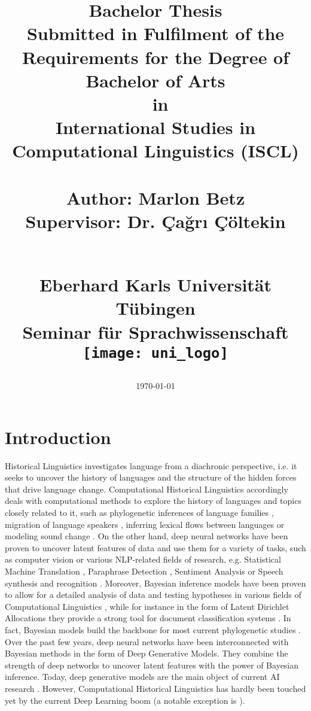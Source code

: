 \documentclass[6pt]{article}
\title{
	{Bachelor Thesis}\\
	{\normalsize Submitted in Fulfilment of the Requirements for the Degree of} \\ %
{\large Bachelor of Arts} \\ %
	 {\small in} \\  %
	 {\large  International Studies in Computational Linguistics (ISCL) } \\ \vspace*{1cm} \hline \vspace*{1cm} 
	{\Huge \mathrm{Unsupervised Cognate Identification with Variational Autoencoders}}\\ \vspace*{1cm} \hline \vspace*{1cm}
	{\LARGE  Author: Marlon Betz }  \\
	{\LARGE  Supervisor: Dr. Çağrı Çöltekin }  \\
\date{\today} \\
\vspace*{2cm}
	{\Large Eberhard Karls Universität Tübingen}\\
	{\large Seminar für Sprachwissenschaft} \\
	\vspace*{1cm}
	{\texttt{[image: uni\_logo]}}
}
\begin{document}
\thispagestyle{empty}
\maketitle
\thispagestyle{empty}
\newpage

 

\newpage
\newpage

\tableofcontents
\thispagestyle{empty}
\newpage
{}
\setcounter{page}{1}

\section{Introduction}

Historical Linguistics investigates language from a diachronic perspective, i.e. it seeks to uncover the history of languages and the structure of the hidden forces that drive language change.  Computational Historical Linguistics accordingly deals with computational methods to explore the history of languages and topics closely related to it, such as phylogenetic inferences of language families \citep{bouckaert2012mapping}, migration of language speakers \citep{gray2009language}, inferring lexical flows between languages \citep{dellert2015uralic} or modeling sound change \citep{bouchard2013automated}.  
On the other hand, deep neural networks have been proven to uncover latent features of data and use them for a variety of tasks, such as computer vision or various NLP-related fields of research, e.g. Statistical Machine Translation \citep{zhang2014bilingually,lauly2014autoencoder}, Paraphrase Detection \citep{socher2011dynamic}, Sentiment Analysis \citep{socher2013recursive} or Speech synthesis  and recognition \citep{hinton2012deep,zen2014deep}. 
Moreover, Bayesian inference models have been proven to allow for a detailed analysis of data and testing hypotheses in various fields of Computational Linguistics \citep{crocker2010computational,chater2006probabilistic}, while for instance in the form of Latent Dirichlet Allocations they provide a strong tool for document classification systems \citep{blei2003latent}. In fact, Bayesian models build the backbone for most current phylogenetic studies \citep{gray2009language,bouckaert2012mapping,bouchard2013automated}.
Over the past few years, deep neural networks have been interconnected with Bayesian methods in the form of Deep Generative Models. They combine the strength of deep networks to uncover latent features with the power of Bayesian inference. Today, deep generative models are the main object of current AI research \citep[p. 654]{Goodfellow-et-al-2016-Book}. 
 However, Computational Historical Linguistics has hardly been touched yet by the current Deep Learning boom (a notable exception is \cite{rama2016siamese}). 
\end{document}
